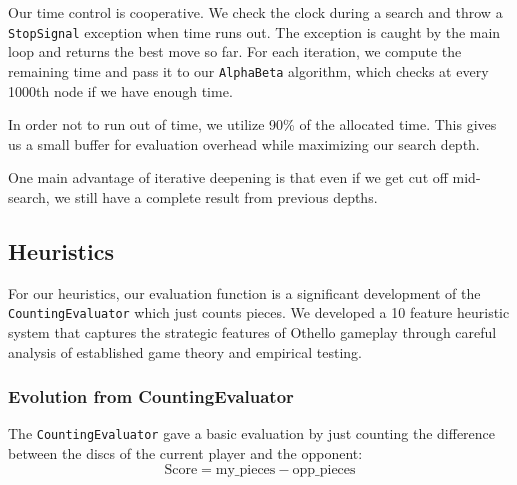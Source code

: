 \documentclass[10pt, titlepage, oneside, a4paper]{article}
\begin{document}
Our time control is cooperative. We check the clock during a search and throw 
a \texttt{StopSignal} exception when time runs out. The exception is caught by 
the main loop and returns the best move so far. For each iteration, we compute 
the remaining time and pass it to our \texttt{AlphaBeta} algorithm, which checks 
at every 1000th node if we have enough time.

In order not to run out of time, we utilize 90\% of the allocated time. 
This gives us a small buffer for evaluation overhead while maximizing our 
search depth.

One main advantage of iterative deepening is that even if we get cut off 
mid-search, we still have a complete result from previous depths.




\subsection{Heuristics}

For our heuristics, our evaluation function is a significant development of the \texttt{CountingEvaluator} which just counts pieces. We developed a 10 feature heuristic system that captures the strategic features of Othello gameplay through careful analysis of established game theory and empirical testing.

\subsubsection{Evolution from CountingEvaluator}
The \texttt{CountingEvaluator} gave a basic evaluation by just counting the difference between the discs of the current player and the opponent:
\begin{equation}
\text{Score} = \text{my\_pieces} - \text{opp\_pieces}
\end{equation}
\end{document}
